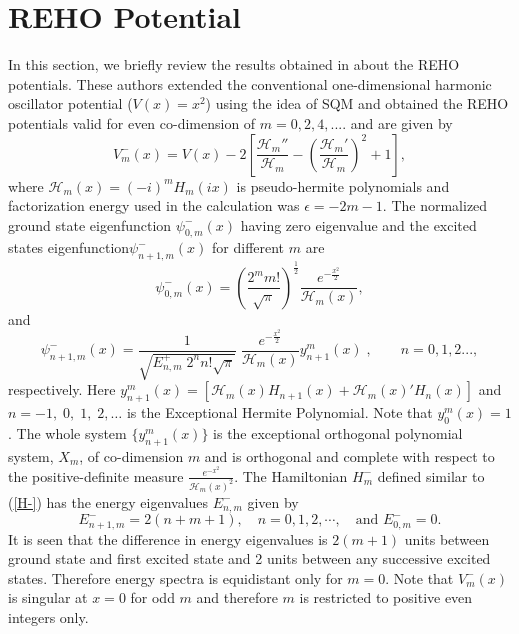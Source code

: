 \documentclass[11pt]{article}
\begin{document}
\section{REHO Potential}
In this section, we briefly review the results obtained in  
\cite{ fellows2009factorization,marquette2013two} about the REHO 
potentials. These authors extended the conventional one-dimensional harmonic 
oscillator potential ($V(x)=x^2$) using the idea of SQM and obtained the REHO 
potentials valid for even co-dimension of $m=0,2,4,....$ and are given by
\begin{equation}
V^-_m(x)=V(x)-2\left[ \frac{\mathcal{H}_m''}{\mathcal{H}_m}-\left(\frac{\mathcal{H}_m'}{\mathcal{H}_m}\right)^2+1\right],
\end{equation} 
where $\mathcal{H}_m(x)=(-i)^mH_m(ix)$ is pseudo-hermite polynomials and factorization energy used in the calculation was \( \epsilon=-2m-1 \). The 
normalized ground state eigenfunction \( \psi^-_{0,m}(x) \) having zero 
eigenvalue and the excited states eigenfunction\( \psi^-_{n+1,m}(x) \) for different $m$ are
\begin{equation}
\psi^-_{0,m}(x)=\left( \frac{2^m m!}{\sqrt{\pi}}\right)^{ \frac{1}{2}}  \frac{e^{- \frac{x^2}{2}}}{\mathcal{H}_m(x)}, \label{RE-GS}
\end{equation} 
and
\begin{equation}
\psi^-_{n+1,m}(x)=\frac{1}{\sqrt{E^+_{n,m}\;2^{n}n!\sqrt{\pi}}}\;\frac{e^{- \frac{x^2}{2}}}{\mathcal{H}_m(x)} y^m_{n+1}(x) \;,\qquad n=0,1,2...,	
\end{equation}
 respectively. 
Here \( y^m_{n+1}(x)=\left[\mathcal{H}_m(x)H_{n+1}(x)
+\mathcal{H}_m(x)'H_{n}(x)\right]\) and \( n = -1,\;0,\;1,\;2,\dots \)  
is the Exceptional Hermite Polynomial. Note that 
\(y^{m}_{0}(x) = 1 \).
The whole system $\{ y^m_{n+1}(x)\}$ is the exceptional orthogonal polynomial system, \( X_m \), of co-dimension \( m \) and is orthogonal and complete with respect to the positive-definite measure \( \frac{e^{-x^2}}{\mathcal{H}_m(x)^2} \). 
The Hamiltonian \( H^-_m \) defined similar to (\ref{H-}) has the energy eigenvalues \( E^-_{n,m} \) given by
 \begin{equation}\label{1}
 E^-_{n+1,m}=2(n+m+1),\quad n=0,1,2,\cdots,\quad \text{and } E^-_{0,m}=0. 
 \end{equation} 
It is seen that the difference in energy eigenvalues is \( 2(m+1) \) units between ground state and first excited state and 2 units between any successive excited states. Therefore energy spectra is equidistant only for \( m=0 \). Note that \( V^-_m(x)\) is singular at \( x=0 \) for odd \( m \) and therefore \( m \) is restricted to positive even integers only.
\end{document}
